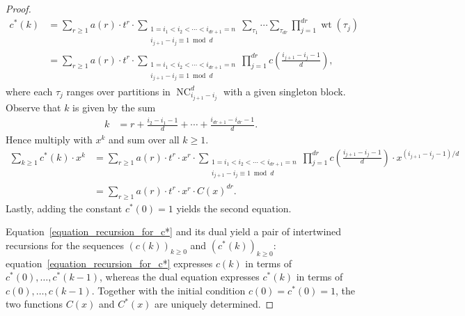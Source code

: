 \documentclass[10pt,a4paper]{amsart}
\DeclareMathOperator{\NC}{NC}
\DeclareMathOperator{\wt}{wt}
\begin{document}
\begin{proof}
\begin{align}
c^{*}(k)
& =
\sum_{r \geq 1}
a(r)
\cdot
t^{r}
\cdot
\sum_{
\substack{1 = i_{1} < i_{2} < \cdots < i_{dr+1} = n \\
i_{j+1} - i_{j} \equiv 1 \bmod d}
}
\sum_{\tau_{1}}
\cdots
\sum_{\tau_{dr}}
\prod_{j=1}^{dr}
\wt(\tau_{j}) \\
\nonumber
& =
\sum_{r \geq 1}
a(r)
\cdot
t^{r}
\cdot
\sum_{
\substack{1 = i_{1} < i_{2} < \cdots < i_{dr+1} = n \\
i_{j+1} - i_{j} \equiv 1 \bmod d}
}
\prod_{j=1}^{dr}
c\left( \frac{i_{j+1} - i_{j} - 1}{d} \right) ,
\end{align}
where each $\tau_{j}$ ranges over partitions in 
$\NC^{d}_{i_{j+1}-i_{j}}$
with a given singleton block.
Observe that $k$ is given by the sum
\begin{align*}
k
& =
r + \frac{i_{2} - i_{1} - 1}{d}
+ \cdots + \frac{i_{dr+1} - i_{dr} - 1}{d} .
\end{align*}
Hence multiply with $x^{k}$ and sum over all $k \geq 1$.
\begin{align*}
\sum_{k \geq 1} c^{*}(k) \cdot x^{k}
& =
\sum_{r \geq 1}
a(r) \cdot t^{r} \cdot x^{r} \cdot
\sum_{
\substack{1 = i_{1} < i_{2} < \cdots < i_{dr+1} = n \\
i_{j+1} - i_{j} \equiv 1 \bmod d}
}
\prod_{j=1}^{dr}
c\left( \frac{i_{j+1} - i_{j} - 1}{d} \right) 
\cdot
x^{({i_{j+1} - i_{j} - 1})/{d}} \\
& =
\sum_{r \geq 1}
a(r) \cdot t^{r} \cdot x^{r} \cdot C(x)^{dr} .
\end{align*}
Lastly, adding the constant $c^{*}(0) = 1$ yields the second equation.

Equation~\eqref{equation_recursion_for_c*} and its dual
yield a pair of intertwined recursions for the sequences
$(c(k))_{k\geq 0}$ and $(c^{*}(k))_{k\geq 0}$: 
equation~\eqref{equation_recursion_for_c*}
expresses $c(k)$ 
in terms of $c^{*}(0), \ldots, c^{*}(k-1)$, whereas the 
dual equation
expresses $c^{*}(k)$
in terms of $c(0), \ldots, c(k-1)$.
Together with the initial condition $c(0) = c^{*}(0) = 1$,
the two functions $C(x)$ and $C^{*}(x)$ are uniquely determined.



\end{proof}
\end{document}

